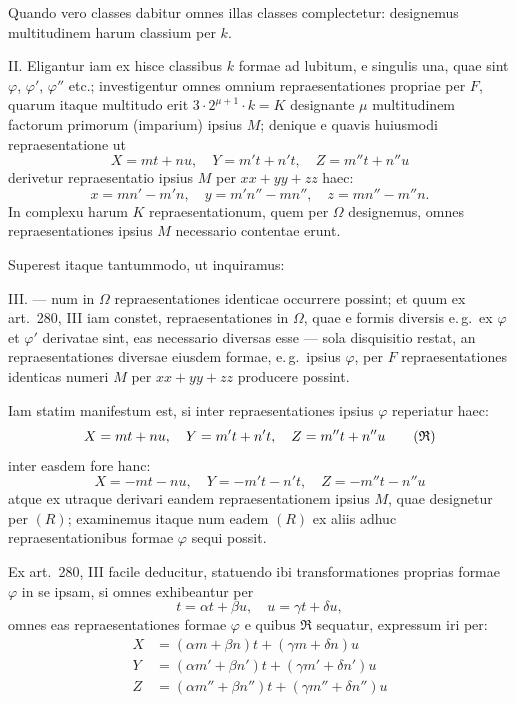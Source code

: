\documentclass[12pt,a4paper]{article}
\theoremstyle{plain}
\theoremstyle{definition}
\theoremstyle{remark}
\begin{document}
Quando vero classes dabitur omnes illas classes complectetur: designemus
multitudinem harum classium per $k$.

\textsc{II.} Eligantur iam ex hisce classibus $k$ formae ad lubitum, e singulis
una, quae sint $\varphi$, $\varphi'$, $\varphi''$ etc.; investigentur omnes omnium repraesentationes
propriae per $F$, quarum itaque multitudo erit $3 \cdot 2^{\mu+1} \cdot k = K$ designante
$\mu$ multitudinem factorum primorum (imparium) ipsius $M$; denique e quavis
huiusmodi repraesentatione ut
\[
X = mt + nu, \quad Y = m't + n't, \quad Z = m''t + n''u
\]
derivetur repraesentatio ipsius $M$ per $xx + yy + zz$ haec:
\[
x = mn' - m'n, \quad y = m'n'' - mn'', \quad z = mn'' - m''n.
\]
In complexu harum $K$ repraesentationum, quem per $\Omega$ designemus, omnes
repraesentationes ipsius $M$ necessario contentae erunt.

Superest itaque tantummodo, ut inquiramus:

\textsc{III.} --- num in $\Omega$ repraesentationes identicae occurrere possint; et
quum ex art.\@~280, III iam constet, repraesentationes in $\Omega$, quae e formis
diversis e.\,g.\ ex $\varphi$ et $\varphi'$ derivatae sint, eas necessario diversas esse --- sola
disquisitio restat, an repraesentationes diversae eiusdem formae, e.\,g.\ ipsius
$\varphi$, per $F$ repraesentationes identicas numeri $M$ per $xx + yy + zz$ producere
possint.

Iam statim manifestum est, si inter repraesentationes ipsius $\varphi$ reperiatur haec:
\begin{equation}\label{eq:R}
X = mt + nu, \quad Y = m't + n't, \quad Z = m''t + n''u \tag{$\mathfrak{R}$}
\end{equation}
inter easdem fore hanc:
\[
X = -mt - nu, \quad Y = -m't - n't, \quad Z = -m''t - n''u
\]
atque ex utraque derivari eandem repraesentationem ipsius $M$, quae designetur
per $(R)$; examinemus itaque num eadem $(R)$ ex aliis adhuc repraesentationibus
formae $\varphi$ sequi possit.

Ex art.\@~280, III facile deducitur, statuendo ibi transformationes proprias
formae $\varphi$ in se ipsam, si omnes exhibeantur per
\[
t = \alpha t + \beta u, \quad u = \gamma t + \delta u,
\]
omnes eas repraesentationes formae $\varphi$ e quibus $\mathfrak{R}$ sequatur, expressum iri per:
\begin{align*}
X &= (\alpha m + \beta n)t + (\gamma m + \delta n)u \\
Y &= (\alpha m' + \beta n')t + (\gamma m' + \delta n')u \\
Z &= (\alpha m'' + \beta n'')t + (\gamma m'' + \delta n'')u
\end{align*}
\end{document}

